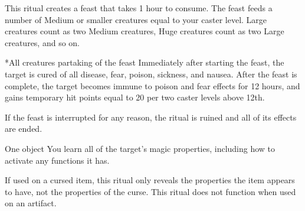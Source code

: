\spellline
\spelleffect This ritual creates a feast that takes 1 hour to consume. The feast feeds a number of Medium or smaller creatures equal to your caster level. Large creatures count as two Medium creatures, Huge creatures count as two Large creatures, and so on.
\begin{spelltargets}*{All creatures partaking of the feast}
    Immediately after starting the feast, the target is cured of all disease, fear, poison, sickness, and nausea. After the feast is complete, the target becomes immune to poison and fear effects for 12 hours, and gains temporary hit points equal to 20  per two caster levels above 12th.
\end{spelltargets}

\spellnotes If the feast is interrupted for any reason, the ritual is ruined and all of its effects are ended.

\begin{spelltarget}{One object}
    \spelleffect You learn all of the target's magic properties, including how to activate any functions it has.
\end{spelltarget}
\spellnotes If used on a cursed item, this ritual only reveals the properties the item appears to have, not the properties of the curse. This ritual does not function when used on an artifact.

